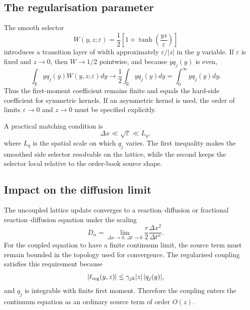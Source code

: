 \documentclass[5p,final]{elsarticle}
\begin{document}
\subsection{The regularisation parameter}

The smooth selector
\begin{equation}
W(y,z;\varepsilon)=\frac12\left[1+\tanh\left(\frac{yz}{\varepsilon}\right)\right]
\end{equation}
introduces a transition layer of width approximately $\varepsilon/|z|$ in the $y$ variable.  If $\varepsilon$ is fixed and $z\to0$, then $W\to1/2$ pointwise, and because $yq_j(y)$ is even,
\begin{equation}
\int_{\mathbb R}yq_j(y)W(y,z;\varepsilon)dy
\to \frac12\int_{\mathbb R}yq_j(y)dy
=\int_0^\infty yq_j(y)dy.
\end{equation}
Thus the first-moment coefficient remains finite and equals the hard-side coefficient for symmetric kernels.  If an asymmetric kernel is used, the order of limits $\varepsilon\to0$ and $z\to0$ must be specified explicitly.

A practical matching condition is
\begin{equation}
\Delta x\ll \sqrt{\varepsilon}\ll L_q,
\end{equation}
where $L_q$ is the spatial scale on which $q_j$ varies.  The first inequality makes the smoothed side selector resolvable on the lattice, while the second keeps the selector local relative to the order-book source shape.

\subsection{Impact on the diffusion limit}

The uncoupled lattice update converges to a reaction--diffusion or fractional reaction--diffusion equation under the scaling
\begin{equation}
D_\alpha=\lim_{\Delta x\to0,\,\Delta t\to0}
\frac{r}{2}\frac{\Delta x^2}{\Delta t^\alpha}.
\end{equation}
For the coupled equation to have a finite continuum limit, the source term must remain bounded in the topology used for convergence.  The regularised coupling satisfies this requirement because
\begin{equation}
|\ell_{\rm reg}(y,z)|
\leq \gamma_{jk}|z|\,|q_j(y)|,
\end{equation}
and $q_j$ is integrable with finite first moment.  Therefore the coupling enters the continuum equation as an ordinary source term of order $O(z)$.
\end{document}

